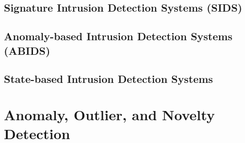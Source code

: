 	\subsection{Signature Intrusion Detection Systems (SIDS)}
	\subsection{Anomaly-based Intrusion Detection Systems (ABIDS)}
	\subsection{State-based Intrusion Detection Systems}

\section{Anomaly, Outlier, and Novelty Detection}

